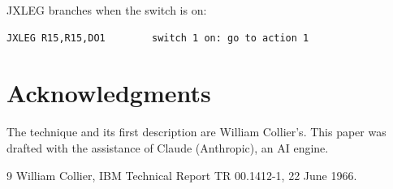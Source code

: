 \documentclass[11pt]{article}
\begin{document}
JXLEG branches when the switch is on:

\begin{Verbatim}[fontsize=\small]
         JXLEG R15,R15,DO1        switch 1 on: go to action 1
\end{Verbatim}

\section*{Acknowledgments}
The technique and its first description are William Collier's. This paper
was drafted with the assistance of Claude (Anthropic), an AI engine.

\begin{thebibliography}{9}
William Collier, IBM Technical Report TR 00.1412-1, 22 June 1966.
\end{thebibliography}
\end{document}
